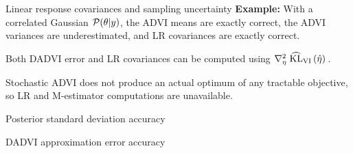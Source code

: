 \documentclass[8pt]{beamer}\usepackage[]{graphicx}\usepackage[]{color}
\begin{document}
\begin{frame}{Linear response covariances and sampling uncertainty}
\textbf{Example: } With a correlated Gaussian $\mathcal{P}(\theta \vert y)$,
the ADVI means are exactly correct, the ADVI variances are underestimated,
and LR covariances are exactly correct.

\pause

\hrulefill

Both DADVI error and LR covariances can be computed using
$\nabla^2_{\eta} \left. \widehat{\mathrm{KL}}_{\mathrm{VI}}\left(\hat{\eta}\right) \right.$.

Stochastic ADVI does not produce an actual optimum of any tractable
objective, so LR and M-estimator computations are unavailable.

\end{frame}



\begin{frame}{Posterior standard deviation accuracy}
    \PosteriorSdAccuracy{}
\end{frame}


\begin{frame}{DADVI approximation error accuracy}
    \CoverageHistogram{}
\end{frame}


\end{document}

